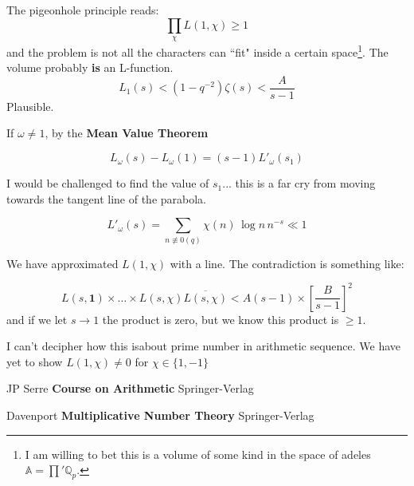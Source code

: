 \documentclass[12pt]{article}
\begin{document}
\noindent The pigeonhole principle reads:
$$ \prod_\chi L(1, \chi) \geq 1 $$  
and the problem is not all the characters can ``fit" inside a certain space\footnote{I am willing to bet this is a volume of some kind in the space of adeles $\mathbb{A} = \prod' \mathbb{Q}_p$.}.  The volume probably \textbf{is} an L-function.  
$$ L_1(s) < (1 - q^{-2})\zeta(s) < \frac{A}{s-1}$$
Plausible.
\newpage 

\noindent If $\omega \neq 1$, by the \textbf{Mean Value Theorem}

$$ L_\omega(s) - L_\omega(1) = (s-1)L'_\omega (s_1)$$

I would be challenged to find the value of $s_1$... this is a far cry from moving towards the tangent line of the parabola.

$$ L'_\omega(s) = \sum_{n \not \equiv 0 (q)} \chi(n) \, \log n \, n^{-s} \ll 1 $$

We have approximated $L(1, \chi)$ with a line.  The contradiction is something like:

$$ L(s, \mathbf{1})\times \dots \times L(s, \chi)\overline{L(s, \chi)} < A(s-1) \times 
\left[\frac{B}{s-1}\right]^2 $$
and if we let $s \to 1$ the product is zero, but we know this product is $\geq 1$. \newline

\noindent I can't decipher how this isabout prime number in arithmetic sequence.  We have yet to show $L(1, \chi) \neq 0$ for $\chi \in \{ 1, -1\}$  

\newpage

\selectfont \fontsize{12}{10}\selectfont

\begin{thebibliography}{}

\item JP Serre \textbf{Course on Arithmetic} Springer-Verlag

\item Davenport \textbf{Multiplicative Number Theory} Springer-Verlag



\end{thebibliography}
\end{document}
